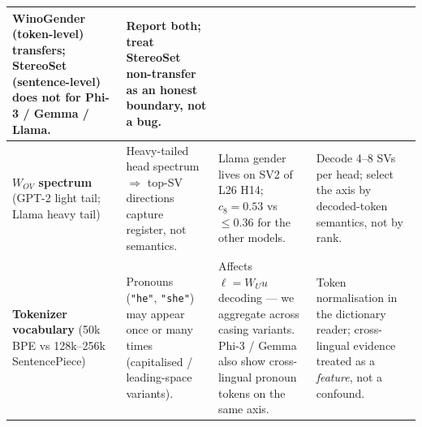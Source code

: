\documentclass[11pt]{article}
\begin{document}
\begin{tcolorbox}[keybox, title=How each architectural difference propagated into the experiment pipeline]
\begin{center}
\begin{tabular}{@{}p{4.5cm}|p{9cm}|p{8cm}|p{6.5cm}@{}}
WinoGender (token-level) transfers; StereoSet (sentence-level) does not for Phi-3 / Gemma / Llama. &
Report both; treat StereoSet non-transfer as an honest boundary, not a bug. \\
\midrule
\textbf{$W_{OV}$ spectrum} (GPT-2 light tail; Llama heavy tail) &
Heavy-tailed head spectrum $\Rightarrow$ top-SV directions capture register, not semantics. &
Llama gender lives on SV2 of L26 H14; $c_8 = 0.53$ vs $\le 0.36$ for the other models. &
Decode 4--8 SVs per head; select the axis by decoded-token semantics, not by rank. \\
\midrule
\textbf{Tokenizer vocabulary} (50k BPE vs 128k--256k SentencePiece) &
Pronouns (\texttt{"he"}, \texttt{"she"}) may appear once or many times (capitalised / leading-space variants). &
Affects $\ell = W_U u$ decoding --- we aggregate across casing variants. Phi-3 / Gemma also show cross-lingual pronoun tokens on the same axis. &
Token normalisation in the dictionary reader; cross-lingual evidence treated as a \emph{feature}, not a confound. \\
\bottomrule
\end{tabular}
\end{center}
\end{tcolorbox}

\vspace{6pt}
\end{document}
